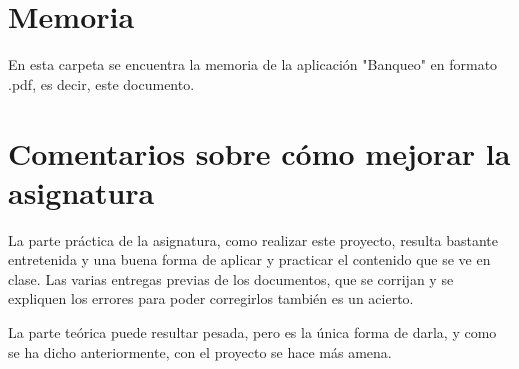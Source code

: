 \documentclass[12pt]{article}
\begin{document}
\section{Memoria}
En esta carpeta se encuentra la memoria de la aplicación "Banqueo" en formato .pdf, es decir, este documento.


\section*{Comentarios sobre cómo mejorar la asignatura}
La parte práctica de la asignatura, como realizar este proyecto, resulta bastante entretenida y una buena forma de aplicar y practicar el contenido que se ve en clase. Las varias entregas previas de los documentos, que se corrijan y se expliquen los errores para poder corregirlos también es un acierto.

La parte teórica puede resultar pesada, pero es la única forma de darla, y como se ha dicho anteriormente, con el proyecto se hace más amena.
\end{document}

